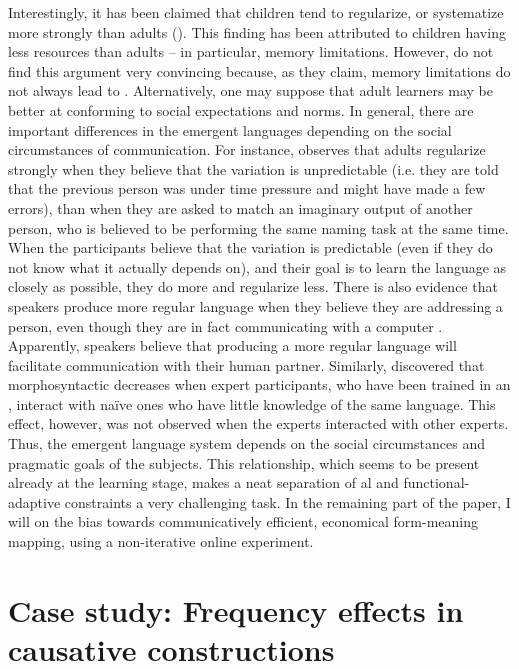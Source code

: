 \documentclass[output=paper]{langsci/langscibook}
\begin{document}
Interestingly, it has been claimed that children tend to regularize, or systematize more strongly than adults (\citealt{HudsonKamNewport2009}). This finding has been attributed to children having less  resources than adults – in particular, memory limitations. However, \citet{SmithEtAl2017} do not find this argument very convincing because, as they claim, memory limitations do not always lead to . Alternatively, one may suppose that adult learners may be better at conforming to social expectations and norms. In general, there are important differences in the emergent languages depending on the social circumstances of communication. For instance, \citet{Perfors2016} observes that adults regularize strongly when they believe that the variation is unpredictable (i.e. they are told that the previous person was under time pressure and might have made a few errors), than when they are asked to match an imaginary output of another person, who is believed to be performing the same naming task at the same time. When the participants believe that the variation is predictable (even if they do not know what it actually depends on), and their goal is to learn the language as closely as possible, they do  more and regularize less. There is also evidence that speakers produce more regular language when they believe they are addressing a person, even though they are in fact communicating with a computer \citep{FehérEtAl2016}. Apparently, speakers believe that producing a more regular language will facilitate communication with their human partner. Similarly, \citet{Little2011} discovered that morphosyntactic  decreases when expert participants, who have been trained in an , interact with naïve ones who have little knowledge of the same language. This effect, however, was not observed when the experts interacted with other experts. Thus, the emergent language system depends on the social circumstances and pragmatic goals of the subjects. This relationship, which seems to be present already at the learning stage, makes a neat separation of al and functional-adaptive constraints a very challenging task.  
\newpage
In the remaining part of the paper, I will  on the bias towards communicatively efficient, economical form-meaning mapping, using a non-iterative online experiment.

\section{Case study: Frequency effects in causative constructions}\label{sec:levshina:3}
\end{document}
